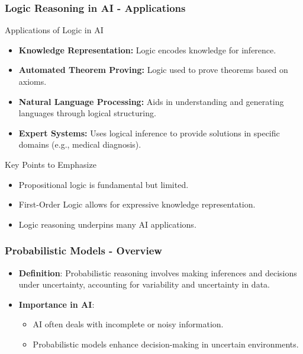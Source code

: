 \documentclass[aspectratio=169]{beamer}
\begin{document}
\begin{frame}[fragile]
  \frametitle{Logic Reasoning in AI - Applications}
  \begin{block}{Applications of Logic in AI}
    \begin{itemize}
      \item \textbf{Knowledge Representation:} Logic encodes knowledge for inference.
      \item \textbf{Automated Theorem Proving:} Logic used to prove theorems based on axioms.
      \item \textbf{Natural Language Processing:} Aids in understanding and generating languages through logical structuring.
      \item \textbf{Expert Systems:} Uses logical inference to provide solutions in specific domains (e.g., medical diagnosis).
    \end{itemize}
  \end{block}
  
  \begin{block}{Key Points to Emphasize}
    \begin{itemize}
      \item Propositional logic is fundamental but limited.
      \item First-Order Logic allows for expressive knowledge representation.
      \item Logic reasoning underpins many AI applications.
    \end{itemize}
  \end{block}
\end{frame}

\begin{frame}[fragile]
    \frametitle{Probabilistic Models - Overview}
    \begin{itemize}
        \item \textbf{Definition}:
        Probabilistic reasoning involves making inferences and decisions under uncertainty, accounting for variability and uncertainty in data.
        
        \item \textbf{Importance in AI}:
        \begin{itemize}
            \item AI often deals with incomplete or noisy information.
            \item Probabilistic models enhance decision-making in uncertain environments.
        \end{itemize}
    \end{itemize}
\end{frame}
\end{document}
